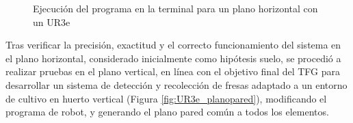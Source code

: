    \begin{figure}[H]
      \begin{center}
        \subcapcentertrue
        \hspace{1mm}
      \end{center}
      \caption{Ejecución del programa en la terminal para un plano horizontal con un UR3e}
      \label{fig:POV_Camara_UR3e_planomesa}
   \end{figure}

Tras verificar la precisión, exactitud y el correcto funcionamiento del sistema en el plano horizontal, considerado inicialmente como hipótesis suelo, se procedió a realizar pruebas en el plano vertical, en línea con el objetivo final del TFG para desarrollar un sistema de detección y recolección de fresas adaptado a un entorno de cultivo en huerto vertical (Figura \ref{fig:UR3e_planopared}), modificando el programa de robot, y generando el plano pared común a todos los elementos. 

